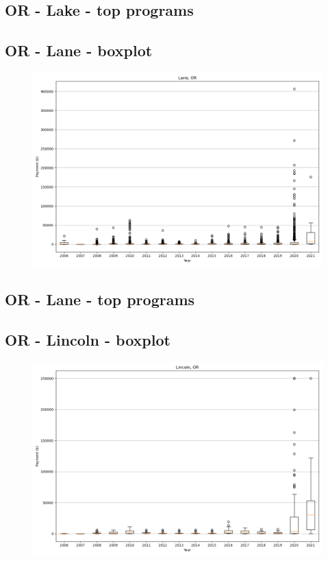 \subsection*{OR - Lake - top programs}

\newpage
\subsection*{OR - Lane - boxplot}
\begin{figure}[h]
\centering
\includegraphics[width=7in]{../output/boxplots/counties/Lane-OR_boxplot.png}
\end{figure}


\subsection*{OR - Lane - top programs}

\newpage
\subsection*{OR - Lincoln - boxplot}
\begin{figure}[h]
\centering
\includegraphics[width=7in]{../output/boxplots/counties/Lincoln-OR_boxplot.png}
\end{figure}


